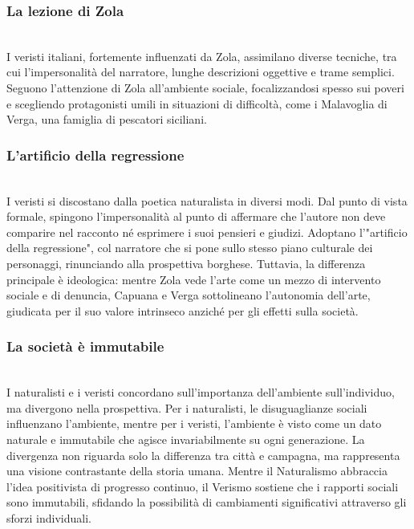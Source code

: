 \documentclass{report}
\begin{document}
\subsubsection{La  lezione  di  Zola}
\\
I veristi italiani, fortemente influenzati da Zola, assimilano diverse tecniche, tra cui l'impersonalità del narratore, lunghe descrizioni oggettive e trame semplici. Seguono l'attenzione di Zola all'ambiente sociale, focalizzandosi spesso sui poveri e scegliendo protagonisti umili in situazioni di difficoltà, come i Malavoglia di Verga, una famiglia di pescatori siciliani.
\\
\subsubsection{L’artificio della regressione}
\\
I veristi si discostano dalla poetica naturalista in diversi modi. Dal punto di vista formale, spingono l'impersonalità al punto di affermare che l'autore non deve comparire nel racconto né esprimere i suoi pensieri e giudizi. Adoptano l'"artificio della regressione", col narratore che si pone sullo stesso piano culturale dei personaggi, rinunciando alla prospettiva borghese. Tuttavia, la differenza principale è ideologica: mentre Zola vede l'arte come un mezzo di intervento sociale e di denuncia, Capuana e Verga sottolineano l'autonomia dell'arte, giudicata per il suo valore intrinseco anziché per gli effetti sulla società.
\\
\subsubsection{La società è immutabile}
\\
I naturalisti e i veristi concordano sull'importanza dell'ambiente sull'individuo, ma divergono nella prospettiva. Per i naturalisti, le disuguaglianze sociali influenzano l'ambiente, mentre per i veristi, l'ambiente è visto come un dato naturale e immutabile che agisce invariabilmente su ogni generazione. La divergenza non riguarda solo la differenza tra città e campagna, ma rappresenta una visione contrastante della storia umana. Mentre il Naturalismo abbraccia l'idea positivista di progresso continuo, il Verismo sostiene che i rapporti sociali sono immutabili, sfidando la possibilità di cambiamenti significativi attraverso gli sforzi individuali.
\\
\end{document}
